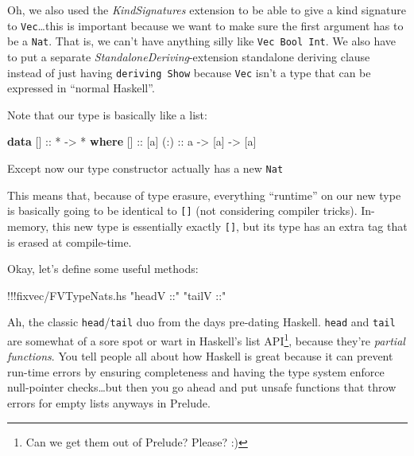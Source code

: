 \documentclass[]{article}
\newenvironment{Shaded}{}{}
\newcommand{\KeywordTok}[1]{\textcolor[rgb]{0.00,0.44,0.13}{\textbf{{#1}}}}
\newcommand{\StringTok}[1]{\textcolor[rgb]{0.25,0.44,0.63}{{#1}}}
\newcommand{\OtherTok}[1]{\textcolor[rgb]{0.00,0.44,0.13}{{#1}}}
\newcommand{\FunctionTok}[1]{\textcolor[rgb]{0.02,0.16,0.49}{{#1}}}
\newcommand{\NormalTok}[1]{{#1}}
\begin{document}
Oh, we also used the \emph{KindSignatures} extension to be able to give
a kind signature to \texttt{Vec}\ldots{}this is important because we
want to make sure the first argument has to be a \texttt{Nat}. That is,
we can't have anything silly like \texttt{Vec\ Bool\ Int}. We also have
to put a separate \emph{StandaloneDeriving}-extension standalone
deriving clause instead of just having \texttt{deriving\ Show} because
\texttt{Vec} isn't a type that can be expressed in ``normal Haskell''.

Note that our type is basically like a list:

\begin{Shaded}
\begin{Highlighting}[]
\KeywordTok{data} \NormalTok{[]}\OtherTok{ ::} \FunctionTok{*} \OtherTok{->} \FunctionTok{*} \KeywordTok{where}
    \NormalTok{[]}\OtherTok{  ::} \NormalTok{[a]}
\OtherTok{    (:) ::} \NormalTok{a }\OtherTok{->} \NormalTok{[a] }\OtherTok{->} \NormalTok{[a]}
\end{Highlighting}
\end{Shaded}

Except now our type constructor actually has a new \texttt{Nat}

This means that, because of type erasure, everything ``runtime'' on our
new type is basically going to be identical to \texttt{{[}{]}} (not
considering compiler tricks). In-memory, this new type is essentially
exactly \texttt{{[}{]}}, but its type has an extra tag that is erased at
compile-time.

Okay, let's define some useful methods:

\begin{Shaded}
\begin{Highlighting}[]
\FunctionTok{!!!}\NormalTok{fixvec}\FunctionTok{/}\NormalTok{FVTypeNats.hs }\StringTok{"headV ::"} \StringTok{"tailV ::"}
\end{Highlighting}
\end{Shaded}

Ah, the classic \texttt{head}/\texttt{tail} duo from the days pre-dating
Haskell. \texttt{head} and \texttt{tail} are somewhat of a sore spot or
wart in Haskell's list API\footnote{Can we get them out of Prelude?
  Please? :)}, because they're \emph{partial functions}. You tell people
all about how Haskell is great because it can prevent run-time errors by
ensuring completeness and having the type system enforce null-pointer
checks\ldots{}but then you go ahead and put unsafe functions that throw
errors for empty lists anyways in Prelude.
\end{document}
